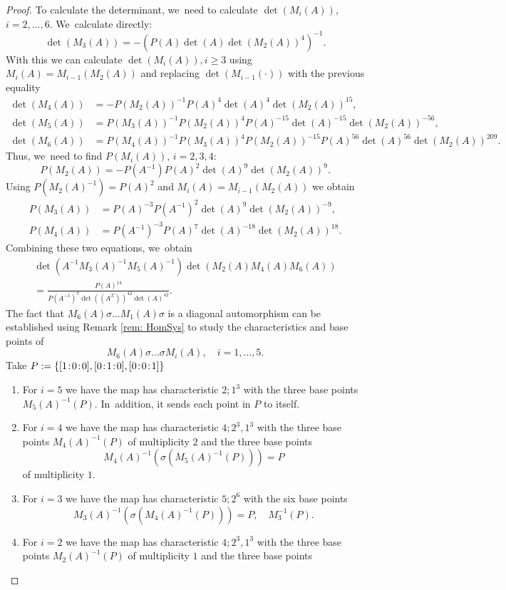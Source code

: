 \documentclass[JEP,XML,SOM,Unicode,NoFloatCountersInSection, NoEqCountersInSection,published]{cedram}
\newcommand{\sep}{\mkern2mu{:}\mkern2mu}
\theoremstyle{definition}
\begin{document}
\begin{proof}
To calculate the determinant, we~need to calculate $\det(M_i(A))$, $i=2, \dots , 6$. We~calculate directly:
\[
\det(M_3(A))=-(P(A)\det(A)\det(M_2(A))^4)^{-1}.
\]
With this we can calculate $\det(M_i(A)), i \geq 3$ using $M_i(A) = M_{i-1}(M_2(A))$ and replacing $\det(M_{i-1}(\cdot))$ with the previous equality
\begin{align*}
\det(M_4(A))&=-P(M_2(A))^{-1}P(A)^4\det(A)^4\det(M_2(A))^{15},
\\
\det(M_5(A))&=P(M_3(A))^{-1}P(M_2(A))^4P(A)^{-15}\det(A)^{-15}\det(M_2(A))^{-56},
\\
\det(M_6(A))&=P(M_4(A))^{-1}P(M_3(A))^4P(M_2(A))^{-15}P(A)^{56}\det(A)^{56}\det(M_2(A))^{209}.
\end{align*}
Thus, we~need to find $P(M_i(A))$, $i=2,3,4$:
\[
P(M_2(A)) = -P(A^{-1})P(A)^2\det(A)^9\det(M_2(A))^9.
\]
Using $P(M_2(A)^{-1}) = P(A)^2$ and $M_i(A) = M_{i-1}(M_2(A))$ we obtain
\begin{align*}
P(M_3(A)) &= P(A)^{-3}P(A^{-1})^2\det(A)^9\det(M_2(A))^{-9},
\\
P(M_4(A))&=P(A^{-1})^{-3}P(A)^7\det(A)^{-18}\det(M_2(A))^{18}.
\end{align*}
Combining these two equations, we~obtain
\begin{multline*}
\det(A^{-1}M_3(A)^{-1}M_5(A)^{-1})\det(M_2(A)M_4(A)M_6(A))
\\
= \frac{P(A)^{14}}{P(A^{-1})^7 \det((A^{\Sigma}))^{42}\det(A)^{42}}.
\end{multline*}
The fact that $M_6(A) \sigma \dots M_1(A) \sigma$ is a diagonal automorphism can be established using Remark \ref{rem: HomSys} to study the characteristics and base points of
\[
M_6(A) \sigma \dots \sigma M_i(A),\quad i = 1, \dots , 5.
\]
Take $P := \{[1\sep 0\sep 0],[0\sep 1\sep 0],[0\sep 0\sep 1]\}$
\begin{enumerate}
\item For $i = 5$ we have the map has characteristic $2;1^3$ with the three base points $M_5(A)^{-1}(P)$. In~addition, it sends each point in $P$ to itself.
\item For $i = 4$ we have the map has characteristic $4;2^3,1^3$ with the three base points $M_4(A)^{-1}(P)$ of multiplicity $2$ and the three base points
\[
M_4(A)^{-1}(\sigma(M_5(A)^{-1}(P))) = P
\]
of multiplicity $1$.
\item For $i = 3$ we have the map has characteristic $5;2^6$ with the six base points
\[
M_3(A)^{-1}(\sigma(M_4(A)^{-1}(P))) = P, \quad M_3^{-1}(P).
\]
\item For $i = 2$ we have the map has characteristic $4;2^3,1^3$ with the three base points $M_2(A)^{-1}(P)$ of multiplicity $1$ and the three base points

\end{enumerate}
\end{proof}
\end{document}
